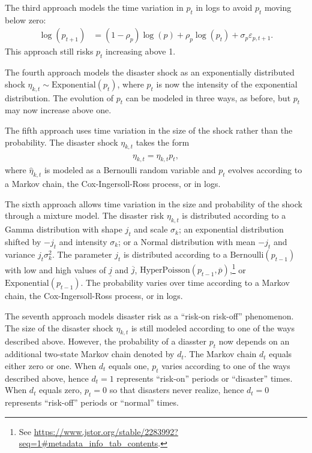 \documentclass[12 pt, oneside]{article}
\theoremstyle{definition}
\theoremstyle{definition}
\theoremstyle{definition}
\begin{document}
The third approach models the time variation in $p_t$ in logs to avoid $p_t$ moving below zero:
\begin{align}
  \log(p_{t + 1}) & = (1 - \rho_p) \log(p) + \rho_p \log(p_t) + \sigma_p \varepsilon_{p, t + 1}.
\end{align}
This approach still risks $p_t$ increasing above 1.

The fourth approach models the disaster shock as an exponentially distributed shock $\eta_{k, t} \sim \text{Exponential}(p_t)$, where $p_t$ is now the intensity of the exponential distribution. The evolution of $p_t$ can be modeled in three ways, as before, but $p_t$ may now increase above one.

The fifth approach uses time variation in the size of the shock rather than the probability. The disaster shock $\eta_{k, t}$ takes the form
\begin{align}
  \eta_{k, t} = \hat{\eta}_{k, t} p_t,
\end{align}
where $\hat{\eta}_{k, t}$ is modeled as a Bernoulli random variable and $p_t$ evolves according to a Markov chain, the Cox-Ingersoll-Ross process, or in logs.

The sixth approach allows time variation in the size and probability of the shock through a mixture model. The disaster risk $\eta_{k, t}$ is distributed according to a Gamma distribution with shape $j_t$  and scale $\sigma_k$; an exponential distribution shifted by $-j_t$ and intensity $\sigma_k$; or a Normal distribution with mean $-j_t$ and variance $j_t\sigma_k^2$. The parameter $j_t$ is distributed according to a $\text{Bernoulli}(p_{t - 1})$ with low and high values of $\underline{j}$ and $\overline{j}$, $\text{HyperPoisson}(p_{t - 1}, \overline{p})$,\footnote{See \url{https://www.jstor.org/stable/2283992?seq=1\#metadata_info_tab_contents}.}
 or $\text{Exponential}(p_{t - 1})$. The probability varies over time according to a Markov chain, the Cox-Ingersoll-Ross process, or in logs.

The seventh approach models disaster risk as a ``risk-on risk-off'' phenomenon. The size of the disaster shock $\eta_{k, t}$ is still modeled according to one of the ways described above. However, the probability of a diasster $p_t$ now depends on an additional two-state Markov chain denoted by $d_t$. The Markov chain $d_t$ equals either zero or one. When $d_t$ equals one, $p_t$ varies according to one of the ways described above, hence $d_t = 1$ represents ``risk-on'' periods or ``disaster'' times. When $d_t$ equals zero, $p_t = 0$ so that disasters never realize, hence $d_t = 0$ represents ``risk-off'' periods or ``normal'' times.
\end{document}
